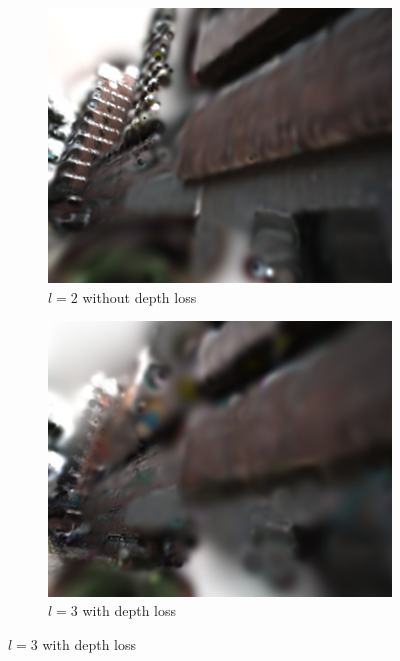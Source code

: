 \documentclass[lettersize,journal]{IEEEtran}
\begin{document}
\begin{figure}[h]
    \begin{subfigure}{0.15\textwidth}
        \includegraphics[width=\linewidth]{image/ablation/wod.png}
        \caption{$l=2$ without depth loss}
        \label{fig:ablationwod}
    \end{subfigure}
    \hspace{0.0001\textwidth} %
    \begin{subfigure}{0.15\textwidth}
        \includegraphics[width=\linewidth]{image/ablation/wd3.png}
        \caption{$l=3$ with depth loss}

\end{subfigure}
\end{figure}
\end{document}
